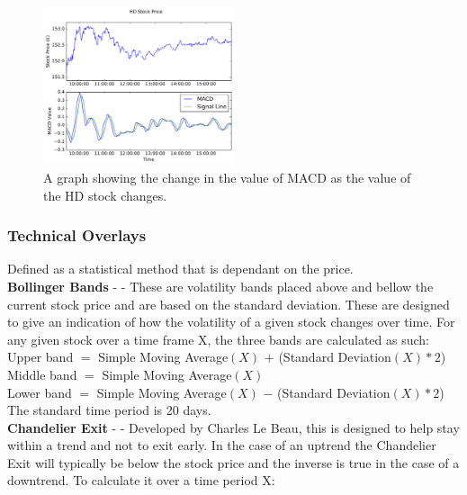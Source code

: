 \documentclass[conference]{IEEEtran}
\begin{document}
\begin{figure}
\includegraphics[width=0.5\textwidth, angle=0]{HDDayMACD.pdf}
\caption{A graph showing the change in the value of MACD as the value of the HD stock changes.}
\label{fig:HDDayMACD}
\end{figure}

\subsubsection{Technical Overlays} Defined as a statistical method that is dependant on the price. \\

\textbf{Bollinger Bands} - \cite{Bollinger1992} - These are volatility bands placed above and bellow the current stock price and are based on the standard deviation. These are designed to give an indication of how the volatility of a given stock changes over time. For any given stock over a time frame X, the three bands are calculated as such:\\

\noindent
Upper band $=$ Simple Moving Average$(X)$ $+$ (Standard Deviation$(X) * 2$)\\
Middle band $=$ Simple Moving Average$(X)$\\
Lower band $=$ Simple Moving Average$(X)$ $-$ (Standard Deviation$(X) * 2$)\\
The standard time period is 20 days.\\

\noindent
\textbf{Chandelier Exit} - \cite{Elder2002} - Developed by Charles Le Beau, this is designed to help stay within a trend and not to exit early. In the case of an uptrend the Chandelier Exit will typically be below the stock price and the inverse is true in the case of a downtrend. To calculate it over a time period X:\\
\end{document}
